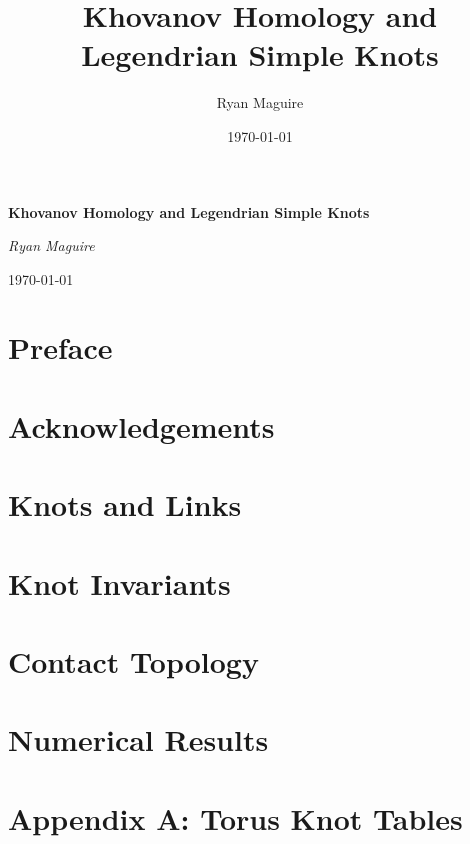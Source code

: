 \documentclass{book}
\title{Khovanov Homology and Legendrian Simple Knots}
\author{Ryan Maguire}
\date{\today}
\theoremstyle{plain}
\theoremstyle{normal}
\begin{document}
    \begin{titlepage}
        \centering
        \LARGE{\bfseries{Khovanov Homology and Legendrian Simple Knots}}
        \par\vspace{3.5cm}
        \par\vspace{4cm}
        \Large{\itshape{Ryan Maguire}}
        \par\vspace{1.5ex}
        \normalsize{\today}
    \end{titlepage}
    \nopagecolor
    \tableofcontents
    \listoffigures
    \listoftables
    \clearpage
    \chapter*{Preface}
        
    \clearpage
    \chapter*{Acknowledgements}
    \clearpage
    \chapter{Knots and Links}
        
        
        
        
    \chapter{Knot Invariants}
        
        
        
        
        
    \chapter{Contact Topology}
        
        
        
        
    \chapter{Numerical Results}
        
        
        
        
        
    \chapter*{Appendix A: Torus Knot Tables}
        
    \clearpage
    
    
\end{document}
